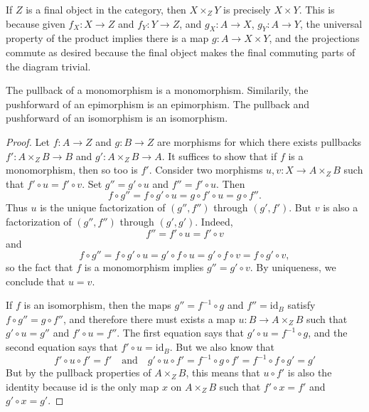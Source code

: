 \begin{example}
    If $Z$ is a final object in the category, then $X \times_Z Y$ is precisely $X \times Y$. This is because given $f_X: X \to Z$ and $f_Y: Y \to Z$, and $g_X: A \to X$, $g_Y: A \to Y$, the universal property of the product implies there is a map $g: A \to X \times Y$, and the projections commute as desired because the final object makes the final commuting parts of the diagram trivial.
\end{example}

\begin{lemma}
    The pullback of a monomorphism is a monomorphism. Similarily, the pushforward of an epimorphism is an epimorphism. The pullback and pushforward of an isomorphism is an isomorphism.
\end{lemma}
\begin{proof}
    Let $f: A \to Z$ and $g: B \to Z$ are morphisms for which there exists pullbacks $f': A \times_Z B \to B$ and $g': A \times_Z B \to A$. It suffices to show that if $f$ is a monomorphism, then so too is $f'$. Consider two morphisms $u,v: X \to A \times_Z B$ such that $f' \circ u = f' \circ v$. Set $g'' = g' \circ u$ and $f'' = f' \circ u$. Then
    \[ f \circ g'' = f \circ g' \circ u = g \circ f' \circ u = g \circ f''. \]
    Thus $u$ is the unique factorization of $(g'',f'')$ through $(g',f')$. But $v$ is also a factorization of $(g'',f'')$ through $(g',g')$. Indeed,
    \[ f'' = f' \circ u = f' \circ v \]
    and
    \[ f \circ g'' = f \circ g' \circ u = g' \circ f \circ u = g' \circ f \circ v = f \circ g' \circ v, \]
    so the fact that $f$ is a monomorphism implies $g'' = g' \circ v$. By uniqueness, we conclude that $u = v$.

    If $f$ is an isomorphism, then the maps $g'' = f^{-1} \circ g$ and $f'' = \text{id}_B$ satisfy $f \circ g'' = g \circ f''$, and therefore there must exists a map $u: B \to A \times_Z B$ such that $g' \circ u = g''$ and $f' \circ u = f''$. The first equation says that $g' \circ u = f^{-1} \circ g$, and the second equation says that $f' \circ u = \text{id}_B$. But we also know that
    \[ f' \circ u \circ f' = f'\quad\text{and}\quad g' \circ u \circ f' = f^{-1} \circ g \circ f' = f^{-1} \circ f \circ g' = g' \]
    But by the pullback properties of $A \times_Z B$, this means that $u \circ f'$ is also the identity because $\text{id}$ is the only map $x$ on $A \times_Z B$ such that $f' \circ x = f'$ and $g' \circ x = g'$.
\end{proof}


